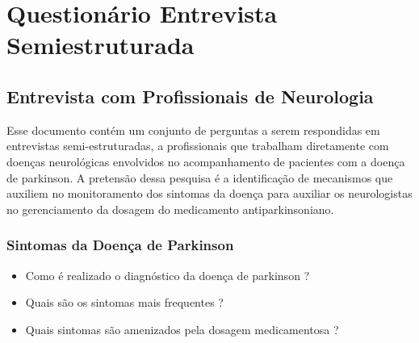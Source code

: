 \chapter{Questionário Entrevista Semiestruturada} \label{apendice:entrevista-semi-estruturada}

\section{Entrevista com Profissionais de Neurologia}

Esse documento contém um conjunto de perguntas a serem respondidas em entrevistas semi-estruturadas, a profissionais que trabalham diretamente com doenças neurológicas envolvidos no acompanhamento de pacientes com a doença de parkinson. A pretensão dessa pesquisa é a identificação de mecanismos que auxiliem no monitoramento dos sintomas da doença para auxiliar os neurologistas no gerenciamento da dosagem do medicamento antiparkinsoniano.

\subsection{Sintomas da Doença de Parkinson}
\begin{itemize}
    \item Como é realizado o diagnóstico da doença de parkinson ?
		\item Quais são os sintomas mais frequentes ?
		\item Quais sintomas são amenizados pela dosagem medicamentosa ?
\end{itemize}

